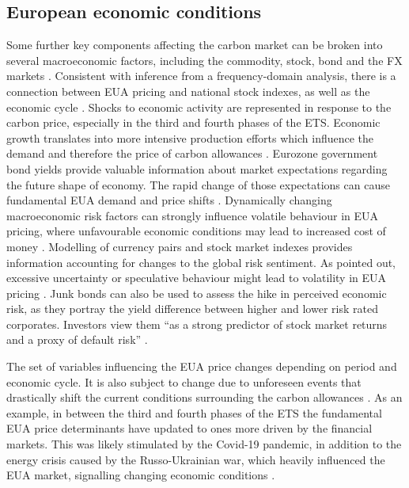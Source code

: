 \documentclass[12pt, letterpaper]{article}
\begin{document}
\subsection{European economic conditions}

Some further key components affecting the carbon market can be broken into several macroeconomic factors, including the commodity, stock, bond and the FX markets \parencite{wang2020}. Consistent with inference from a frequency-domain analysis, there is a connection between EUA pricing and national stock indexes, as well as the economic cycle \parencite{lovcha2021}. Shocks to economic activity are represented in response to the carbon price, especially in the third and fourth phases of the ETS. Economic growth translates into more intensive production efforts which influence the demand and therefore the price of carbon allowances \parencite{lovcha2021}. Eurozone government bond yields provide valuable information about market expectations regarding the future shape of economy. The rapid change of those expectations can cause fundamental EUA demand and price shifts \parencite{salvagnin2024}. Dynamically changing macroeconomic risk factors can strongly influence volatile behaviour in EUA pricing, where unfavourable economic conditions may lead to increased cost of money \parencite{tan2017}. Modelling of currency pairs and stock market indexes provides information accounting for changes to the global risk sentiment. As pointed out, excessive uncertainty or speculative behaviour might lead to volatility in EUA pricing \parencite{salvagnin2024}. Junk bonds can also be used to assess the hike in perceived economic risk, as they portray the yield difference between higher and lower risk rated corporates. Investors view them “as a strong predictor of stock market returns and a proxy of default risk” \parencite{tan2017}.

 The set of variables influencing the EUA price changes depending on period and economic cycle. It is also subject to change due to unforeseen events that drastically shift the current conditions surrounding the carbon allowances \parencite{salvagnin2024}. As an example, in between the third and fourth phases of the ETS the fundamental EUA price determinants have updated to ones more driven by the financial markets. This was likely stimulated by the Covid-19 pandemic, in addition to the energy crisis caused by the Russo-Ukrainian war, which heavily influenced the EUA market, signalling changing economic conditions \parencite{salvagnin2024}.
 
\end{document}

